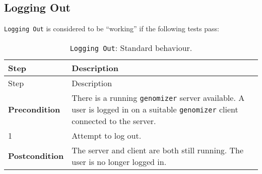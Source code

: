 \subsection{Logging Out}\label{logging-out}

\texttt{Logging\ Out} is considered to be ``working'' if the following
tests pass:

\begin{longtable}[c]{@{}ll@{}}
\caption{\texttt{Logging\ Out}: Standard behaviour.}\tabularnewline
\toprule
\begin{minipage}[b]{0.31\columnwidth}\raggedright\strut
Step
\strut\end{minipage} &
\begin{minipage}[b]{0.63\columnwidth}\raggedright\strut
Description
\strut\end{minipage}\tabularnewline
\midrule
\endfirsthead
\toprule
\begin{minipage}[b]{0.31\columnwidth}\raggedright\strut
Step
\strut\end{minipage} &
\begin{minipage}[b]{0.63\columnwidth}\raggedright\strut
Description
\strut\end{minipage}\tabularnewline
\midrule
\endhead
\begin{minipage}[t]{0.31\columnwidth}\raggedright\strut
\textbf{Precondition}
\strut\end{minipage} &
\begin{minipage}[t]{0.63\columnwidth}\raggedright\strut
There is a running \texttt{genomizer} server available. A user is logged
in on a suitable \texttt{genomizer} client connected to the server.
\strut\end{minipage}\tabularnewline
\begin{minipage}[t]{0.31\columnwidth}\raggedright\strut
1
\strut\end{minipage} &
\begin{minipage}[t]{0.63\columnwidth}\raggedright\strut
Attempt to log out.
\strut\end{minipage}\tabularnewline
\begin{minipage}[t]{0.31\columnwidth}\raggedright\strut
\textbf{Postcondition}
\strut\end{minipage} &
\begin{minipage}[t]{0.63\columnwidth}\raggedright\strut
The server and client are both still running. The user is no longer
logged in.
\strut\end{minipage}\tabularnewline
\bottomrule
\end{longtable}

